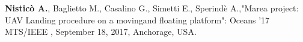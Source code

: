 

\begin{cventries}
\vspace*{-10pt}
  \cventry
    {} %
    {} %
    {} %
    {} %
    {
      \begin{cvitems} %
        \item {\textbf{Nisticò A.}, Baglietto M., Casalino G., Simetti E., Sperindè A.,"Marea project: UAV Landing procedure on a movingand floating platform": Oceans ’17 MTS/IEEE , September 18, 2017, Anchorage, USA.}
      \end{cvitems}
    }

\end{cventries}
